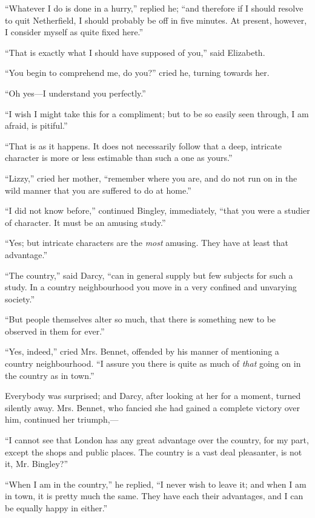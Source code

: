 \documentclass[12pt,openright]{book}
\begin{document}
“Whatever I do is done in a hurry,” replied he; “and therefore if I should resolve to quit Netherfield, I should probably be off in five minutes. At present, however, I consider myself as quite fixed here.”

“That is exactly what I should have supposed of you,” said Elizabeth.

“You begin to comprehend me, do you?” cried he, turning towards her.

“Oh yes—I understand you perfectly.”

“I wish I might take this for a compliment; but to be so easily seen through, I am afraid, is pitiful.”

“That is as it happens. It does not necessarily follow that a deep, intricate character is more or less estimable than such a one as yours.”

“Lizzy,” cried her mother, “remember where you are, and do not run on in the wild manner that you are suffered to do at home.”

“I did not know before,” continued Bingley, immediately, “that you were a studier of character. It must be an amusing study.”

“Yes; but intricate characters are the \textit{most} amusing. They have at least that advantage.”

“The country,” said Darcy, “can in general supply but few subjects for such a study. In a country neighbourhood you move in a very confined and unvarying society.”

“But people themselves alter so much, that there is something new to be observed in them for ever.”

“Yes, indeed,” cried Mrs. Bennet, offended by his manner of mentioning a country neighbourhood. “I assure you there is quite as much of \textit{that} going on in the country as in town.”

Everybody was surprised; and Darcy, after looking at her for a moment, turned silently away. Mrs. Bennet, who fancied she had gained a complete victory over him, continued her triumph,—

“I cannot see that London has any great advantage over the country, for my part, except the shops and public places. The country is a vast deal pleasanter, is not it, Mr. Bingley?”

“When I am in the country,” he replied, “I never wish to leave it; and when I am in town, it is pretty much the same. They have each their advantages, and I can be equally happy in either.”
\end{document}
